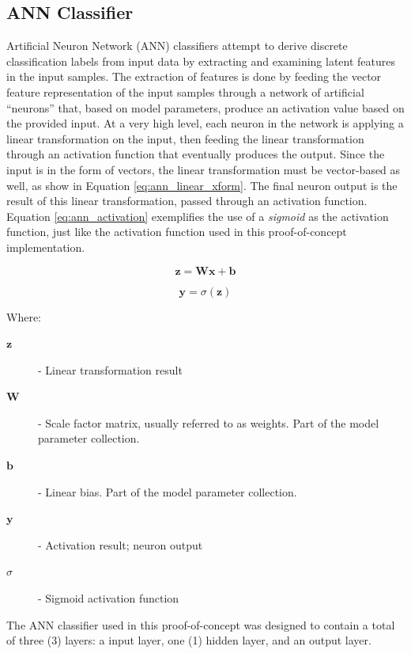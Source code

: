 \documentclass[conference]{sig-alternate-05-2015}
\begin{document}
\subsection{ANN Classifier}\label{subsec:ann_classfier}

Artificial Neuron Network (ANN) classifiers attempt to derive discrete
classification labels from input data by extracting and examining latent
features in the input samples. The extraction of features is done by feeding
the vector feature representation of the input samples through a network of
artificial ``neurons'' that, based on model parameters, produce an activation
value based on the provided input. At a very high level, each neuron in the
network is applying a linear transformation on the input, then feeding the
linear transformation through an activation function that eventually produces
the output. Since the input is in the form of vectors, the linear transformation
must be vector-based as well, as show in Equation \ref{eq:ann_linear_xform}. The
final neuron output is the result of this linear transformation, passed through
an activation function. Equation \ref{eq:ann_activation} exemplifies the use of
a \textit{sigmoid} as the activation function, just like the activation function
used in this proof-of-concept implementation.

\begin{equation}
  \label{eq:ann_linear_xform}
  \textbf{z} = \textbf{W}\textbf{x} + \textbf{b}
\end{equation}

\begin{equation}
  \label{eq:ann_activation}
  \textbf{y} = \sigma(\textbf{z})
\end{equation}

\noindent Where:
\begin{description}
  \item[$\textbf{z}$] - Linear transformation result
  \item[$\textbf{W}$] - Scale factor matrix, usually referred to as weights.
  Part of the model parameter collection.
  \item[$\textbf{b}$] - Linear bias. Part of the model parameter collection.
  \item[$\textbf{y}$] - Activation result; neuron output
  \item[$\sigma$] - Sigmoid activation function 
\end{description}

The ANN classifier used in this proof-of-concept was designed to contain a total
of three (3) layers: a input layer, one (1) hidden layer, and an output layer.
\end{document}
